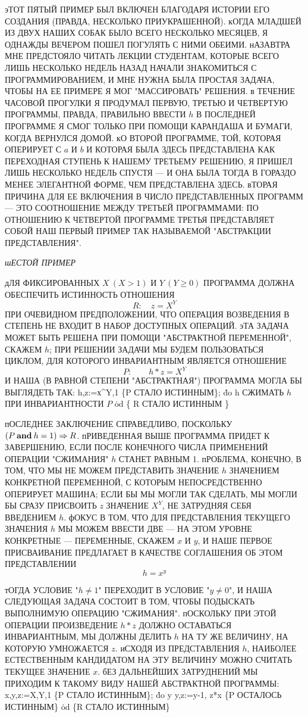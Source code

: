 эТОТ ПЯТЫЙ ПРИМЕР БЫЛ ВКЛЮЧЕН БЛАГОДАРЯ ИСТОРИИ ЕГО
СОЗДАНИЯ (ПРАВДА, НЕСКОЛЬКО ПРИУКРАШЕННОЙ). кОГДА
МЛАДШЕЙ ИЗ ДВУХ НАШИХ СОБАК БЫЛО ВСЕГО НЕСКОЛЬКО МЕСЯЦЕВ,
Я ОДНАЖДЫ ВЕЧЕРОМ ПОШЕЛ ПОГУЛЯТЬ С НИМИ ОБЕИМИ. нАЗАВТРА
МНЕ ПРЕДСТОЯЛО ЧИТАТЬ ЛЕКЦИИ СТУДЕНТАМ, КОТОРЫЕ ВСЕГО ЛИШЬ
НЕСКОЛЬКО НЕДЕЛЬ НАЗАД НАЧАЛИ ЗНАКОМИТЬСЯ С ПРОГРАММИРОВАНИЕМ,
И МНЕ НУЖНА БЫЛА ПРОСТАЯ ЗАДАЧА, ЧТОБЫ НА ЕЕ 
ПРИМЕРЕ Я МОГ "МАССИРОВАТЬ" РЕШЕНИЯ. в ТЕЧЕНИЕ ЧАСОВОЙ ПРОГУЛКИ
Я ПРОДУМАЛ ПЕРВУЮ, ТРЕТЬЮ И ЧЕТВЕРТУЮ ПРОГРАММЫ, ПРАВДА,
ПРАВИЛЬНО ВВЕСТИ $h$ В ПОСЛЕДНЕЙ ПРОГРАММЕ Я СМОГ ТОЛЬКО
ПРИ ПОМОЩИ КАРАНДАША И БУМАГИ, КОГДА ВЕРНУЛСЯ ДОМОЙ. кО
ВТОРОЙ ПРОГРАММЕ, ТОЙ, КОТОРАЯ ОПЕРИРУЕТ С $a$ И $b$ И КОТОРАЯ
БЫЛА ЗДЕСЬ ПРЕДСТАВЛЕНА КАК ПЕРЕХОДНАЯ СТУПЕНЬ К НАШЕМУ
ТРЕТЬЕМУ РЕШЕНИЮ, Я ПРИШЕЛ ЛИШЬ НЕСКОЛЬКО НЕДЕЛЬ СПУСТЯ ---
И ОНА БЫЛА ТОГДА В ГОРАЗДО МЕНЕЕ ЭЛЕГАНТНОЙ ФОРМЕ, ЧЕМ ПРЕДСТАВЛЕНА
ЗДЕСЬ. вТОРАЯ ПРИЧИНА ДЛЯ ЕЕ ВКЛЮЧЕНИЯ В ЧИСЛО
ПРЕДСТАВЛЕННЫХ ПРОГРАММ --- ЭТО СООТНОШЕНИЕ МЕЖДУ ТРЕТЬЕЙ
ПРОГРАММАМИ: ПО ОТНОШЕНИЮ К ЧЕТВЕРТОЙ ПРОГРАММЕ ТРЕТЬЯ
ПРЕДСТАВЛЯЕТ СОБОЙ НАШ ПЕРВЫЙ ПРИМЕР ТАК НАЗЫВАЕМОЙ
"АБСТРАКЦИИ ПРЕДСТАВЛЕНИЯ".

{\sl шЕСТОЙ ПРИМЕР}

дЛЯ ФИКСИРОВАННЫХ $X\ (X>1)$ И $Y\ (Y\ge 0)$ ПРОГРАММА ДОЛЖНА
ОБЕСПЕЧИТЬ ИСТИННОСТЬ ОТНОШЕНИЯ
$$
R: \quad z=X^Y
$$
ПРИ ОЧЕВИДНОМ ПРЕДПОЛОЖЕНИИ, ЧТО ОПЕРАЦИЯ ВОЗВЕДЕНИЯ В СТЕПЕНЬ
НЕ ВХОДИТ В НАБОР ДОСТУПНЫХ ОПЕРАЦИЙ. эТА ЗАДАЧА МОЖЕТ БЫТЬ
РЕШЕНА ПРИ ПОМОЩИ "АБСТРАКТНОЙ ПЕРЕМЕННОЙ", СКАЖЕМ $h$;
ПРИ РЕШЕНИИ ЗАДАЧИ МЫ БУДЕМ ПОЛЬЗОВАТЬСЯ ЦИКЛОМ, ДЛЯ КОТОРОГО
ИНВАРИАНТНЫМ ЯВЛЯЕТСЯ ОТНОШЕНИЕ
$$
P:\qquad h * z=X^Y
$$
И НАША (В РАВНОЙ СТЕПЕНИ "АБСТРАКТНАЯ") ПРОГРАММА МОГЛА 
БЫ ВЫГЛЯДЕТЬ ТАК:
\prg
h,z:=х^Y,1 \{P СТАЛО ИСТИННЫМ\};
\.{do} h \TO СЖИМАТЬ $h$ ПРИ ИНВАРИАНТНОСТИ $P$ \.{od}
\{ R СТАЛО ИСТИННЫМ \}
\grp

пОСЛЕДНЕЕ ЗАКЛЮЧЕНИЕ СПРАВЕДЛИВО, ПОСКОЛЬКУ $(P \mathbin{\bf and} h=1)\Rightarrow R$.
пРИВЕДЕННАЯ ВЫШЕ ПРОГРАММА ПРИДЕТ К ЗАВЕРШЕНИЮ, ЕСЛИ
ПОСЛЕ КОНЕЧНОГО ЧИСЛА ПРИМЕНЕНИЙ ОПЕРАЦИИ "СЖИМАНИЯ" $h$
СТАНЕТ РАВНЫМ 1. пРОБЛЕМА, КОНЕЧНО, В ТОМ, ЧТО МЫ НЕ МОЖЕМ
ПРЕДСТАВИТЬ ЗНАЧЕНИЕ $h$ ЗНАЧЕНИЕМ КОНКРЕТНОЙ ПЕРЕМЕННОЙ, 
С КОТОРЫМ НЕПОСРЕДСТВЕННО ОПЕРИРУЕТ МАШИНА; ЕСЛИ БЫ МЫ
МОГЛИ ТАК СДЕЛАТЬ, МЫ МОГЛИ БЫ СРАЗУ ПРИСВОИТЬ $z$ ЗНАЧЕНИЕ
$X^Y$, НЕ ЗАТРУДНЯЯ СЕБЯ ВВЕДЕНИЕМ $h$. фОКУС В ТОМ, ЧТО
ДЛЯ ПРЕДСТАВЛЕНИЯ ТЕКУЩЕГО ЗНАЧЕНИЯ $h$ МЫ МОЖЕМ ВВЕСТИ ДВЕ ---
НА ЭТОМ УРОВНЕ КОНКРЕТНЫЕ --- ПЕРЕМЕННЫЕ, СКАЖЕМ $x$ И $y$,
И НАШЕ ПЕРВОЕ ПРИСВАИВАНИЕ ПРЕДЛАГАЕТ В КАЧЕСТВЕ СОГЛАШЕНИЯ
ОБ ЭТОМ ПРЕДСТАВЛЕНИИ
$$
h=x^y
$$

тОГДА УСЛОВИЕ "$h\not=1$" ПЕРЕХОДИТ В УСЛОВИЕ "$y\not=0$", И НАША
СЛЕДУЮЩАЯ ЗАДАЧА СОСТОИТ В ТОМ, ЧТОБЫ ПОДЫСКАТЬ ВЫПОЛНИМУЮ
ОПЕРАЦИЮ "СЖИМАНИЯ". пОСКОЛЬКУ ПРИ ЭТОЙ ОПЕРАЦИИ
ПРОИЗВЕДЕНИЕ $h*z$ ДОЛЖНО ОСТАВАТЬСЯ ИНВАРИАНТНЫМ, МЫ ДОЛЖНЫ
ДЕЛИТЬ $h$ НА ТУ ЖЕ ВЕЛИЧИНУ, НА КОТОРУЮ УМНОЖАЕТСЯ $z$.
иСХОДЯ ИЗ ПРЕДСТАВЛЕНИЯ $h$, НАИБОЛЕЕ ЕСТЕСТВЕННЫМ КАНДИДАТОМ НА
ЭТУ ВЕЛИЧИНУ МОЖНО СЧИТАТЬ ТЕКУЩЕЕ ЗНАЧЕНИЕ $x$. бЕЗ 
ДАЛЬНЕЙШИХ ЗАТРУДНЕНИЙ МЫ ПРИХОДИМ К ТАКОМУ ВИДУ НАШЕЙ
АБСТРАКТНОЙ ПРОГРАММЫ:
\prg
x,y,z:=X,Y,1 \{P СТАЛО ИСТИННЫМ\};
\.{do} y \TO y,z:=y-1, z*x \{P ОСТАЛОСЬ ИСТИННЫМ\} \.{od}
\{R СТАЛО ИСТИННЫМ\}
\grp

